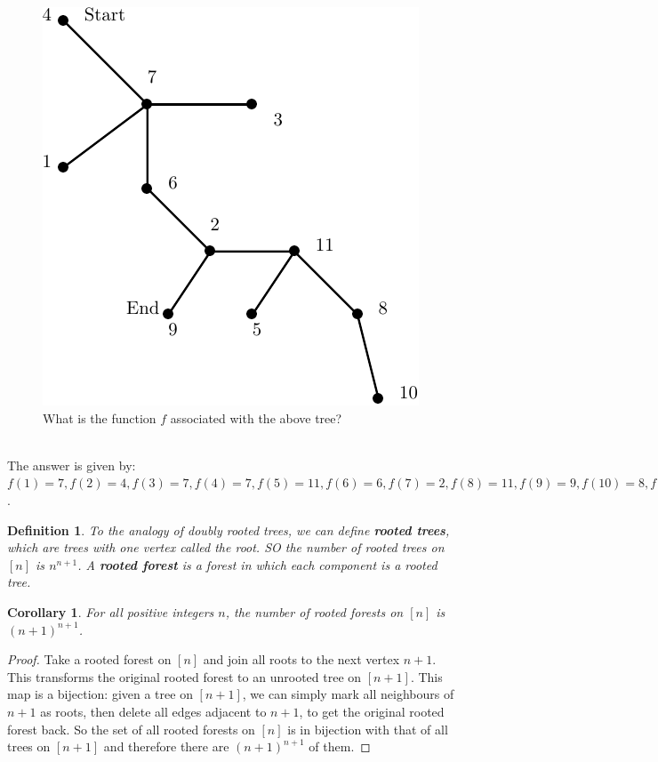 \documentclass[12pt,a4paper]{article}
\newtheorem{cor}{Corollary}[section]
\newtheorem{defn}{Definition}[section]
\theoremstyle{definition}
\begin{document}
\begin{figure}[hbtp]
\centering
\includegraphics[scale=1]{images/graph30.pdf}
\caption{What is the function $f$ associated with the above tree?}
\end{figure}
\\
The answer is given by: $f(1)=7, f(2)=4, f(3)=7, f(4)=7, f(5)=11, f(6)=6, f(7)=2, f(8)=11, f(9)=9, f(10)=8, f(11)=2$. 
\begin{defn} To the analogy of doubly rooted trees, we can define \textbf{rooted trees}, which are trees with one vertex called the root. SO the number of rooted trees on $[n]$ is $n^{n+1}$. A \textbf{rooted forest} is a forest in which each component is a rooted tree. 
\end{defn}
\begin{cor} For all positive integers $n$, the number of rooted forests on $[n]$ is $(n+1)^{n+1}$. 
\end{cor}
\begin{proof}
Take a rooted forest on $[n]$ and join all roots to the next vertex $n+1$. This transforms the original rooted forest to an unrooted tree on $[n+1]$. This map is a bijection: given a tree on $[n+1]$, we can simply mark all neighbours of $n+1$ as roots, then delete all edges adjacent to $n+1$, to get the original rooted forest back. So the set of all rooted forests on $[n]$ is in bijection with that of all trees on $[n+1]$ and therefore there are $(n+1)^{n+1}$ of them. 
\end{proof}
\end{document}
